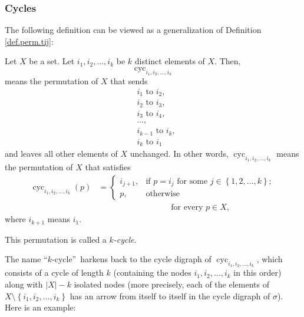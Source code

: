 \subsubsection{Cycles}

The following definition can be viewed as a generalization of Definition
\ref{def.perm.tij}:

\begin{definition}
\label{def.perm.cycs}Let $X$ be a set. Let $i_{1},i_{2},\ldots,i_{k}$ be $k$
distinct elements of $X$. Then,%
\[
\operatorname*{cyc}\nolimits_{i_{1},i_{2},\ldots,i_{k}}%
\]
means the permutation of $X$ that sends%
\begin{align*}
&  i_{1}\text{ to }i_{2},\\
&  i_{2}\text{ to }i_{3},\\
&  i_{3}\text{ to }i_{4},\\
&  \ldots,\\
&  i_{k-1}\text{ to }i_{k},\\
&  i_{k}\text{ to }i_{1}%
\end{align*}
and leaves all other elements of $X$ unchanged. In other words,
$\operatorname*{cyc}\nolimits_{i_{1},i_{2},\ldots,i_{k}}$ means the
permutation of $X$ that satisfies%
\begin{align*}
\operatorname*{cyc}\nolimits_{i_{1},i_{2},\ldots,i_{k}}\left(  p\right)   &  =%
\begin{cases}
i_{j+1}, & \text{if }p=i_{j}\text{ for some }j\in\left\{  1,2,\ldots
,k\right\}  ;\\
p, & \text{otherwise}%
\end{cases}
\\
&
\ \ \ \ \ \ \ \ \ \ \ \ \ \ \ \ \ \ \ \ \ \ \ \ \ \ \ \ \ \ \ \ \ \ \ \ \ \ \ \ \text{for
every }p\in X,
\end{align*}
where $i_{k+1}$ means $i_{1}$.

This permutation is called a $k$\emph{-cycle}.
\end{definition}

The name \textquotedblleft$k$-cycle\textquotedblright\ harkens back to the
cycle digraph of $\operatorname*{cyc}\nolimits_{i_{1},i_{2},\ldots,i_{k}}$,
which consists of a cycle of length $k$ (containing the nodes $i_{1}%
,i_{2},\ldots,i_{k}$ in this order) along with $\left\vert X\right\vert -k$
isolated nodes (more precisely, each of the elements of $X\setminus\left\{
i_{1},i_{2},\ldots,i_{k}\right\}  $ has an arrow from itself to itself in the
cycle digraph of $\sigma$). Here is an example:

